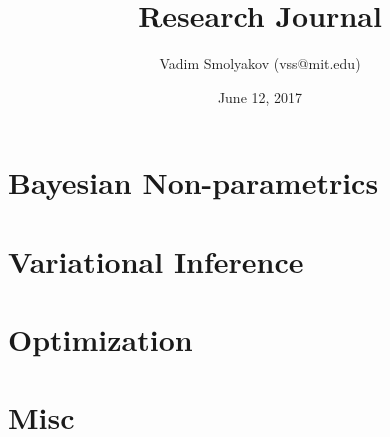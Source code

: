 \documentclass[11pt,a4paper]{article}
\begin{document}
\title{Research Journal}
\date{June 12, 2017}
\author{Vadim Smolyakov (vss@mit.edu)}
\maketitle

%

%

\section{Bayesian Non-parametrics}


\section{Variational Inference}


\section{Optimization}


\section{Misc}


%



\end{document}

